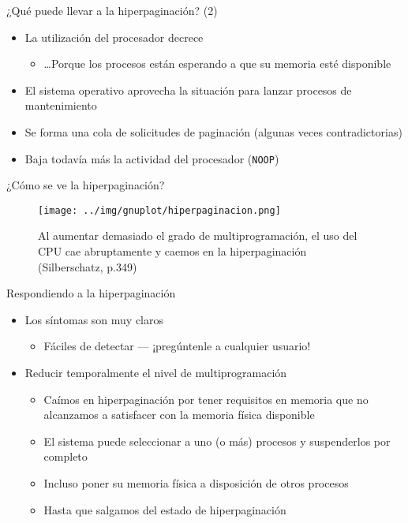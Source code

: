 \documentclass[presentation]{beamer}
\newcommand{\rarrow}{$\rightarrow$\hskip 0.5em}
\begin{document}
\begin{frame}[label={sec:org65924b2},fragile]{¿Qué puede llevar a la hiperpaginación? (2)}
 \begin{itemize}
\item La utilización del procesador decrece
\begin{itemize}
\item \ldots{}Porque los procesos están esperando a que su memoria esté disponible
\end{itemize}
\item El sistema operativo aprovecha la situación para lanzar procesos de
mantenimiento
\item Se forma una cola de solicitudes de paginación (algunas veces
contradictorias)
\item Baja todavía más la actividad del procesador (\texttt{NOOP})
\end{itemize}
\end{frame}

\begin{frame}[label={sec:orgc07dd70}]{¿Cómo se ve la hiperpaginación?}
\begin{figure}[htbp]
\centering
\texttt{[image: ../img/gnuplot/hiperpaginacion.png]}
\caption{Al aumentar demasiado el grado de multiprogramación, el uso del CPU cae abruptamente y caemos en la hiperpaginación  (Silberschatz, p.349)}
\end{figure}
\end{frame}

\begin{frame}[label={sec:org0898e86}]{Respondiendo a la hiperpaginación}
\begin{itemize}
\item Los síntomas son muy claros
\begin{itemize}
\item Fáciles de detectar — ¡pregúntenle a cualquier usuario!
\end{itemize}
\item Reducir temporalmente el nivel de multiprogramación
\begin{itemize}
\item Caímos en hiperpaginación por tener requisitos en memoria que no
alcanzamos a satisfacer con la memoria física disponible
\item El sistema puede seleccionar a uno (o más) procesos y
suspenderlos por completo
\item Incluso poner su memoria física a disposición de otros procesos
\item Hasta que salgamos del estado de hiperpaginación
\end{itemize}
\end{itemize}
\end{frame}
\end{document}
